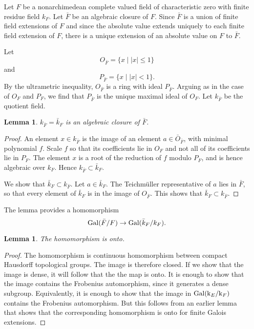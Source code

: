 \documentclass{amsart}
\newtheorem{lemma}[equation]{Lemma}
\def\abs#1{{|#1|}}
\def\oG{\op{Gal}}
\begin{document}
Let $F$ be a nonarchimedean
complete valued field of characteristic zero with finite residue field $k_F$.
Let $\bar{F}$ be an algebraic closure of $F$.  Since $\bar{F}$ is a union of
finite field extensions of $F$ and since the absolute value extends uniquely to
each finite field extension of $F$, there is a unique extension of an absolute
value on $F$ to $\bar{F}$.

Let 
\[
O_{\bar F} = \{x \mid \abs{x}\le 1\}
\]
and
\[
P_{\bar F} = \{x \mid \abs{x} < 1\}.
\]
By the ultrametric inequality, $O_{\bar F}$ is a ring with ideal $P_{\bar F}$.
Arguing as in the case of $O_F$ and $P_F$, we find that $P_{\bar F}$ is the unique
maximal ideal of $O_F$.  Let $k_{\bar F}$ be the quotient field.

\begin{lemma}
$k_{\bar F} = \bar{k}_F$
is an algebraic closure of $\bar{F}$.
\end{lemma}

\begin{proof} An element $x\in k_{\bar F}$ is the image of an element
  $a\in\bar O_{\bar F}$, with minimal polynomial $f$.  Scale $f$ so
  that its coefficients lie in $O_{F}$ and not all of its coefficients
  lie in $P_F$.  The element $x$ is a root of the reduction of $f$
  modulo $P_F$, and is hence algebraic over $k_F$.  Hence $ k_{\bar
    F}\subset \bar{k}_F$.

We show that $\bar{k}_F\subset k_{\bar F}$.  Let $a\in \bar{k}_F$.
The Teichm\"uller representative of $a$ lies in $\bar F$, so that every
element of $\bar{k}_F$ is in the image of $O_{\bar F}$.  This shows
that $\bar{k}_F\subset k_{\bar F}$.
\end{proof}

The lemma provides a homomorphism
\[
\oG(\bar F/F)\to \oG(\bar{k}_{F}/k_F).
\]

\begin{lemma} The homomorphism is onto.
\end{lemma}


\begin{proof} The homomorphism is continuous homomorphism between compact
Hausdorff topological groups.  The image is therefore closed.  If we show
that the image is dense, it will follow that the the map is onto.  It is
enough to show that the image contains the Frobenius automorphism, since
it generates a dense subgroup.  Equivalently, it is enough to show that
the image in $\oG(\op{k}_E/\op{k}_F)$ contains the Frobenius automorphism.
But this follows from an earlier lemma
that shows that the corresponding homomorphism is onto for finite Galois extensions.
\end{proof}
\end{document}
